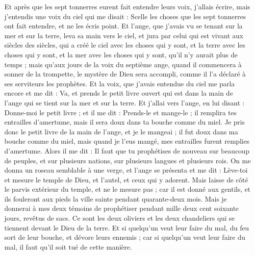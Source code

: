 \begin{multicols}{2}
Et après que les sept tonnerres eurent fait entendre leurs voix, j'allais écrire, mais j'entendis une voix du ciel qui me disait : Scelle les choses que les sept tonnerres ont fait entendre, et ne les écris point.
Et l'ange, que j'avais vu se tenant sur la mer et sur la terre, leva sa main vers le ciel,
et jura par celui qui est vivant aux siècles des siècles, qui a créé le ciel avec les choses qui y sont, et la terre avec les choses qui y sont, et la mer avec les choses qui y sont, qu'il n'y aurait plus de temps ;
mais qu'aux jours de la voix du septième ange, quand il commencera à sonner de la trompette, le mystère de Dieu sera accompli, comme il l'a déclaré à ses serviteurs les prophètes.
Et la voix, que j'avais entendue du ciel me parla encore et me dit : Va, et prends le petit livre ouvert qui est dans la main de l'ange qui se tient sur la mer et sur la terre.
Et j'allai vers l'ange, en lui disant : Donne-moi le petit livre ; et il me dit : Prends-le et mange-le ; il remplira tes entrailles d'amertume, mais il sera doux dans ta bouche comme du miel.
Je pris donc le petit livre de la main de l'ange, et je le mangeai ; il fut doux dans ma bouche comme du miel, mais quand je l'eus mangé, mes entrailles furent remplies d'amertume.
Alors il me dit : Il faut que tu prophétises de nouveau sur beaucoup de peuples, et sur plusieurs nations, sur plusieurs langues et plusieurs rois.
\VerseOne{}On me donna un roseau semblable à une verge, et l'ange se présenta et me dit : Lève-toi et mesure le temple de Dieu, et l'autel, et ceux qui y adorent.
Mais laisse de côté le parvis extérieur du temple, et ne le mesure pas ; car il est donné aux gentils, et ils fouleront aux pieds la ville sainte pendant quarante-deux mois.
Mais je donnerai à mes deux témoins de prophétiser pendant mille deux cent soixante jours, revêtus de sacs.
Ce sont les deux oliviers et les deux chandeliers qui se tiennent devant le Dieu de la terre. 
Et si quelqu'un veut leur faire du mal, du feu sort de leur bouche, et dévore leurs ennemis ; car si quelqu'un veut leur faire du mal, il faut qu'il soit tué de cette manière.

\end{multicols}
